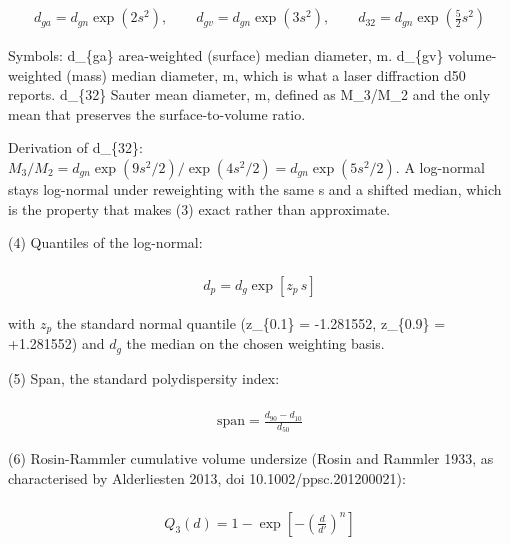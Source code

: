 \documentclass[10pt,a4paper,twoside]{report}
\begin{document}
\begin{equation*}
\begin{gathered}
\\ d_{ga} = d_{gn}\exp(2 s^2), \qquad d_{gv} = d_{gn}\exp(3 s^2), \qquad d_{32} = d_{gn}\exp\left(\tfrac{5}{2}s^2\right)
\end{gathered}
\end{equation*}

Symbols: d\_\{ga\}   area-weighted (surface) median diameter, m. d\_\{gv\}   volume-weighted (mass) median diameter, m, which is what a laser diffraction d50 reports. d\_\{32\}   Sauter mean diameter, m, defined as M\_3/M\_2 and the only mean that preserves the surface-to-volume ratio.

Derivation of d\_\{32\}: $M_3/M_2 = d_{gn}\exp(9s^2/2)/\exp(4s^2/2) = d_{gn}\exp(5s^2/2)$. A log-normal stays log-normal under reweighting with the same s and a shifted median, which is the property that makes (3) exact rather than approximate.

(4) Quantiles of the log-normal:

\begin{equation*}
\begin{gathered}
\\ d_p = d_{g}\exp\!\left[z_p\,s\right]
\end{gathered}
\end{equation*}

with $z_p$ the standard normal quantile (z\_\{0.1\} = -1.281552, z\_\{0.9\} = +1.281552) and $d_g$ the median on the chosen weighting basis.

(5) Span, the standard polydispersity index:

\begin{equation*}
\begin{gathered}
\\ \mathrm{span} = \frac{d_{90} - d_{10}}{d_{50}}
\end{gathered}
\end{equation*}

(6) Rosin-Rammler cumulative volume undersize (Rosin and Rammler 1933, as characterised by Alderliesten 2013, doi 10.1002/ppsc.201200021):

\begin{equation*}
\begin{gathered}
\\ Q_3(d) = 1 - \exp\left[-\left(\frac{d}{d'}\right)^{n}\right]
\end{gathered}
\end{equation*}
\end{document}
